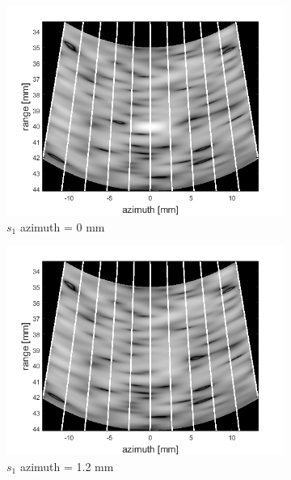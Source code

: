 \begin{figure}[ht]
    \centering
    \begin{subfigure}[t]{0.48\linewidth}
        \includegraphics[width=\linewidth]{./images/others/scallop_loss1.png}
        \caption{$s_1$ azimuth = 0 mm}
        \label{fig:bf_im1}
    \end{subfigure}
    \quad
    \begin{subfigure}[t]{0.48\linewidth}
        \includegraphics[width=\linewidth]{./images/others/scallop_loss2.png}
        \caption{$s_1$ azimuth = 1.2 mm}
        \label{fig:bf_im2}
    \end{subfigure}
    \quad
    \begin{subfigure}[t]{0.48\linewidth}

\end{subfigure}
\end{figure}
